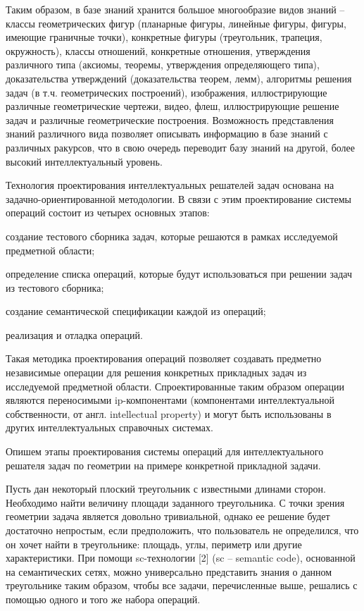 Таким образом, в базе знаний хранится большое многообразие видов знаний -- классы геометрических фигур (планарные фигуры, линейные фигуры, фигуры, имеющие граничные точки), конкретные фигуры (треугольник, трапеция, окружность), классы отношений, конкретные отношения, утверждения различного типа (аксиомы, теоремы, утверждения определяющего типа), доказательства утверждений (доказательства теорем, лемм), алгоритмы решения задач (в т.ч. геометрических построений), изображения, иллюстрирующие различные геометрические чертежи, видео, флеш, иллюстрирующие решение задач и различные геометрические построения. Возможность представления знаний различного вида позволяет описывать информацию в базе знаний с различных ракурсов, что в свою очередь переводит базу знаний на другой, более высокий интеллектуальный уровень.

Технология проектирования интеллектуальных решателей задач основана на задачно-ориентированной методологии. В связи с этим проектирование системы операций состоит из четырех основных этапов:

\begin{textitemize}
	\item создание тестового сборника задач, которые решаются в рамках исследуемой предметной области;
	\item определение списка операций, которые будут использоваться при решении задач из тестового сборника;
	\item создание семантической спецификации каждой из операций;
	\item реализация и отладка операций.
\end{textitemize}

Такая методика проектирования операций позволяет создавать предметно независимые операции для решения конкретных прикладных задач из исследуемой предметной области. Спроектированные таким образом операции являются переносимыми ip-компонентами (компонентами интеллектуальной собственности, от англ. intellectual property) и могут быть использованы в других интеллектуальных справочных системах.

Опишем этапы проектирования системы операций для интеллектуального решателя задач по геометрии на примере конкретной прикладной задачи.

Пусть дан некоторый плоский треугольник с известными длинами сторон. Необходимо найти величину площади заданного треугольника. С точки зрения геометрии задача является довольно тривиальной, однако ее решение будет достаточно непростым, если предположить, что пользователь не определился, что он хочет найти в треугольнике: площадь, углы, периметр или другие характеристики. При помощи sc-технологии {[}2{]} (sc -- semantic code), основанной на семантических сетях, можно универсально представить знания о данном треугольнике таким образом, чтобы все задачи, перечисленные выше, решались с помощью одного и того же набора операций.

